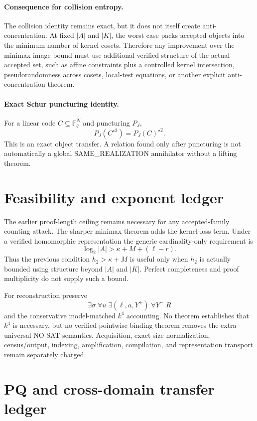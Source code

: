 \documentclass[11pt]{article}
\begin{document}
\paragraph{Consequence for collision entropy.}
The collision identity remains exact, but it does not itself create anti-concentration. At fixed $|A|$ and $|K|$, the worst case packs accepted objects into the minimum number of kernel cosets. Therefore any improvement over the minimax image bound must use additional verified structure of the actual accepted set, such as affine constraints plus a controlled kernel intersection, pseudorandomness across cosets, local-test equations, or another explicit anti-concentration theorem.

\paragraph{Exact Schur puncturing identity.}
For a linear code $C\subseteq\mathbb F_q^N$ and puncturing $P_J$,
\[
P_J(C^{\star2})=P_J(C)^{\star2}.
\]
This is an exact object transfer. A relation found only after puncturing is not automatically a global SAME\_REALIZATION annihilator without a lifting theorem.

\section*{Feasibility and exponent ledger}
The earlier proof-length ceiling remains necessary for any accepted-family counting attack. The sharper minimax theorem adds the kernel-loss term. Under a verified homomorphic representation the generic cardinality-only requirement is
\[
\log_2|A|>\kappa+M+(\ell-r).
\]
Thus the previous condition $h_2>\kappa+M$ is useful only when $h_2$ is actually bounded using structure beyond $|A|$ and $|K|$. Perfect completeness and proof multiplicity do not supply such a bound.

For reconstruction preserve
\[
\exists\sigma\;\forall u\;\exists(\ell,a,Y^+)\;\forall Y^-\;R
\]
and the conservative model-matched $k^4$ accounting. No theorem establishes that $k^4$ is necessary, but no verified pointwise binding theorem removes the extra universal NO-SAT semantics. Acquisition, exact size normalization, census/output, indexing, amplification, compilation, and representation transport remain separately charged.

\section*{PQ and cross-domain transfer ledger}
\end{document}
